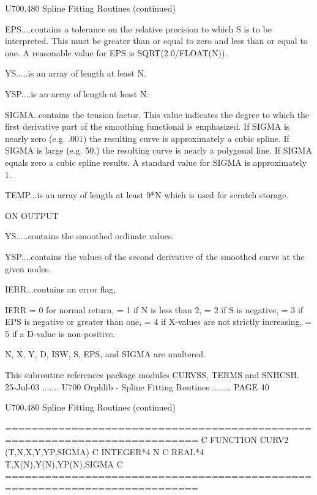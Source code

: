 
 
   U700.480  Spline Fitting Routines (continued)
 
   EPS....contains  a  tolerance on the relative precision to which S is to be
          interpreted. This must be greater than or equal  to  zero  and  less
          than  or  equal  to   one.   A   reasonable   value   for   EPS   is
          SQRT(2.0/FLOAT(N)).
 
   YS.....is an array of length at least N.
 
   YSP....is an array of length at least N.
 
   SIGMA..contains  the  tension  factor.  This  value indicates the degree to
          which the first derivative  part  of  the  smoothing  functional  is
          emphasized.  If SIGMA is nearly zero (e.g. .001) the resulting curve
          is approximately a cubic spline. If SIGMA is large  (e.g.  50.)  the
          resulting  curve  is nearly a polygonal line. If SIGMA equals zero a
          cubic spline results. A standard value for SIGMA is approximately 1.
 
 
   TEMP...is an array of length  at  least  9*N  which  is  used  for  scratch
          storage.
 
                                    ON OUTPUT
 
   YS.....contains the smoothed ordinate values.
 
   YSP....contains  the  values of the second derivative of the smoothed curve
          at the given nodes.
 
   IERR...contains an error flag,
 
          IERR = 0 for normal return,
               = 1 if N is less than 2,
               = 2 if S is negative,
               = 3 if EPS is negative or greater than one,
               = 4 if X-values are not strictly increasing,
               = 5 if a D-value is non-positive.
 
   N, X, Y, D, ISW, S, EPS, and SIGMA are unaltered.
 
   This subroutine references package modules CURVSS, TERMS and SNHCSH.
    
   25-Jul-03 ....... U700  Orphlib - Spline Fitting Routines ........ PAGE  40
 
 
 
   U700.480  Spline Fitting Routines (continued)
 
   ===========================================================================
   C
         FUNCTION CURV2 (T,N,X,Y,YP,SIGMA)
   C
         INTEGER*4  N
   C
         REAL*4     T,X(N),Y(N),YP(N),SIGMA
   C
   ===========================================================================
 

